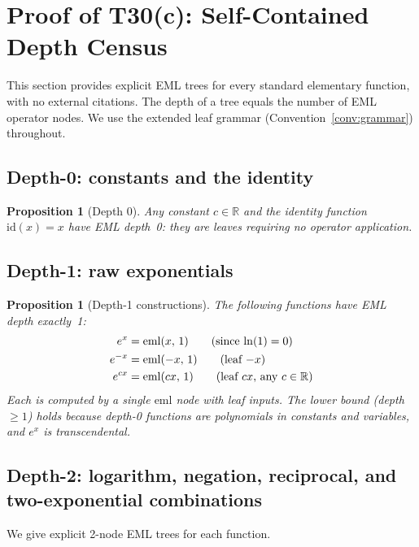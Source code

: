 \documentclass[12pt,a4paper]{article}
\newtheorem{proposition}[theorem]{Proposition}
\theoremstyle{definition}
\theoremstyle{remark}
\begin{document}
\section{Proof of T30(c): Self-Contained Depth Census}
\label{sec:census}

This section provides explicit EML trees for every standard elementary function,
with no external citations.  The depth of a tree equals the number of EML operator
nodes.  We use the extended leaf grammar (Convention~\ref{conv:grammar}) throughout.

\subsection{Depth-0: constants and the identity}

\begin{proposition}[Depth 0]\label{prop:d0}
Any constant $c \in \mathbb{R}$ and the identity function $\mathrm{id}(x) = x$
have EML depth~0: they are leaves requiring no operator application.
\end{proposition}

\subsection{Depth-1: raw exponentials}

\begin{proposition}[Depth-1 constructions]\label{prop:d1}
The following functions have EML depth exactly~1:
\begin{align}
  e^x        &= \mathrm{eml}(x,\, 1) \tag{since $\ln(1)=0$} \\
  e^{-x}     &= \mathrm{eml}(-x,\, 1) \tag{leaf $-x$} \\
  e^{cx}     &= \mathrm{eml}(cx,\, 1) \tag{leaf $cx$, any $c \in \mathbb{R}$}
\end{align}
Each is computed by a single $\mathrm{eml}$ node with leaf inputs.
The lower bound (depth $\geq 1$) holds because depth-0 functions are polynomials
in constants and variables, and $e^x$ is transcendental.
\end{proposition}

\subsection{Depth-2: logarithm, negation, reciprocal, and two-exponential combinations}

We give explicit 2-node EML trees for each function.
\end{document}
